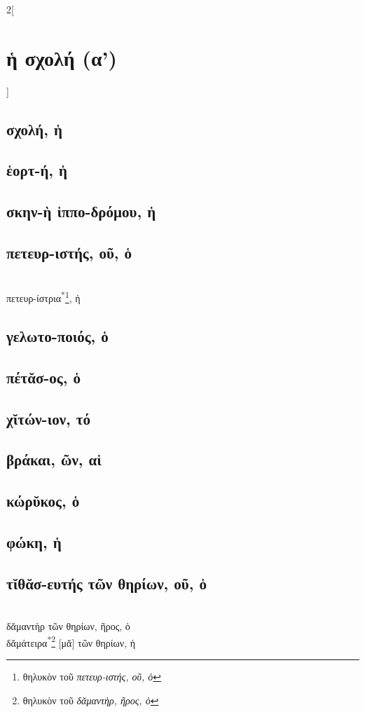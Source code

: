 \documentclass{book}
\begin{document}
\begin{multicols}{2}[\section{ἡ σχολή (α')}] 
\subsection{σχολή, ἡ}
\subsection{ἑορτ-ή, ἡ}
\subsection{σκην-ὴ ἱππο-δρόμου, ἡ}
\subsection{πετευρ-ιστής, οῦ, ὁ}  ~\\
πετευρ-ίστρια\textsuperscript{*}\footnote{θηλυκὸν τοῦ \emph{πετευρ-ιστής, οῦ, ὁ}}, ἡ 
\subsection{γελωτο-ποιός, ὁ}
\subsection{πέτᾰσ-ος, ὁ}
\subsection{χῐτών-ιον, τό}         
\subsection{βράκαι, ῶν, αἱ}
\subsection{κώρῠκος, ὁ}
\subsection{φώκη, ἡ}
\subsection{τῐθᾰσ-ευτής τῶν θηρίων, οῦ, ὁ}
 ~\\
δᾰμαντὴρ τῶν θηρίων, ῆρος, ὁ  \\
δᾰμάτειρα\textsuperscript{*}\footnote{θηλυκὸν τοῦ \emph{δᾰμαντὴρ, ῆρος, ὁ}} [μᾰ] τῶν θηρίων, ἡ

\end{multicols}
\end{document}
